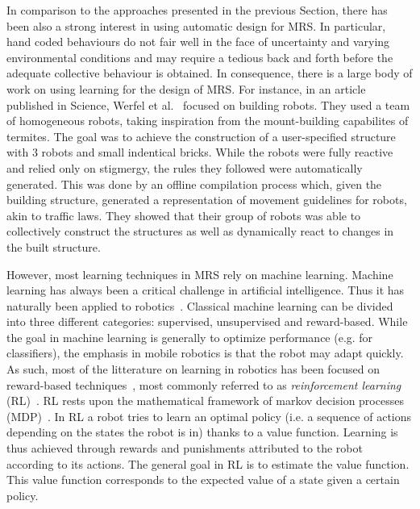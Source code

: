     In comparison to the approaches presented in the previous Section, there has been also a strong interest in using automatic design for MRS. In particular, hand coded behaviours do not fair well in the face of uncertainty and varying environmental conditions and may require a tedious back and forth before the adequate collective behaviour is obtained. In consequence, there is a large body of work on using learning for the design of MRS. For instance, in an article published in Science, Werfel et al.~\parencite{Werfel2014} focused on building robots. They used a team of homogeneous robots, taking inspiration from the mount-building capabilites of termites. The goal was to achieve the construction of a user-specified structure with $3$ robots and small indentical bricks. While the robots were fully reactive and relied only on stigmergy, the rules they followed were automatically generated. This was done by an offline compilation process which, given the building structure, generated a representation of movement guidelines for robots, akin to traffic laws. They showed that their group of robots was able to collectively construct the structures as well as dynamically react to changes in the built structure.

    However, most learning techniques in MRS rely on machine learning. Machine learning has always been a critical challenge in artificial intelligence. Thus it has naturally been applied to robotics~\parencite{Hertzberg2008}. Classical machine learning can be divided into three different categories: supervised, unsupervised and reward-based. While the goal in machine learning is generally to optimize performance (e.g. for classifiers), the emphasis in mobile robotics is that the robot may adapt quickly. As such, most of the litterature on learning in robotics has been focused on reward-based techniques~\parencite{Mataric2008}, most commonly referred to as \emph{reinforcement learning} (RL)~\parencite{Sutton1998}. RL rests upon the mathematical framework of markov decision processes (MDP)~\parencite{Bellman1957}. In RL a robot tries to learn an optimal policy (i.e. a sequence of actions depending on the states the robot is in) thanks to a value function. Learning is thus achieved through rewards and punishments attributed to the robot according to its actions. The general goal in RL is to estimate the value function. This value function corresponds to the expected value of a state given a certain policy.


